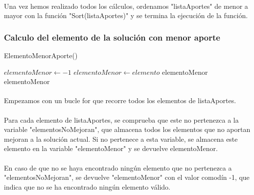 \documentclass{article}
\begin{document}
	\paragraph{}Una vez hemos realizado todos los cálculos, ordenamos "listaAportes" de menor a mayor con la función "Sort(listaAportes)" y se termina la ejecución de la función.

	\subsubsection{Calculo del elemento de la solución con menor aporte}
	\begin{algorithm}[H]
		\caption{ElementoMenorAporte()}
		\begin{algorithmic}
			\STATE $elementoMenor \leftarrow -1$
			\STATE $elementoMenor \leftarrow elemento$
			\RETURN elementoMenor
			\ENDIF
			\ENDFOR
			\RETURN elementoMenor
		\end{algorithmic}
	\end{algorithm}

	\paragraph{}Empezamos con un bucle for que recorre todos los elementos de listaAportes.
	
	\paragraph{}Para cada elemento de listaAportes, se comprueba que este no pertenezca a la variable "elementosNoMejoran", que almacena todos los elementos que no aportan mejoran a la solución actual. Si no pertenece a esta variable, se almacena este elemento en la variable "elementoMenor" y se devuelve elementoMenor.
	
	\paragraph{}En caso de que no se haya encontrado ningún elemento que no pertenezca a "elementosNoMejoran", se devuelve "elementoMenor" con el valor comodín -1, que indica que no se ha encontrado ningún elemento válido.
\end{document}
